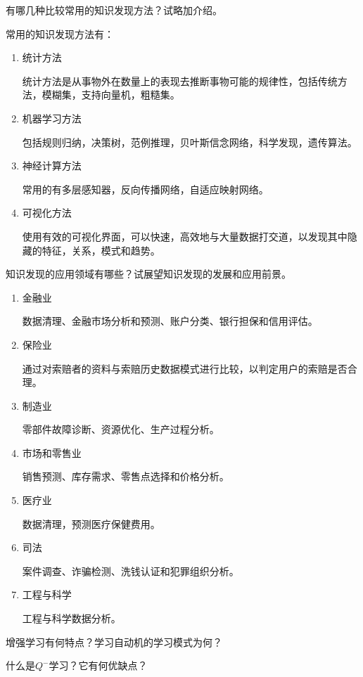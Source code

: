 \begin{question}
有哪几种比较常用的知识发现方法？试略加介绍。
\end{question}
\begin{solution}
常用的知识发现方法有：
	\begin{enumerate}
		\item 统计方法 \par
		统计方法是从事物外在数量上的表现去推断事物可能的规律性，包括传统方法，模糊集，支持向量机，粗糙集。
		\item 机器学习方法 \par
		包括规则归纳，决策树，范例推理，贝叶斯信念网络，科学发现，遗传算法。
		\item 神经计算方法 \par
		常用的有多层感知器，反向传播网络，自适应映射网络。
		\item 可视化方法 \par
		使用有效的可视化界面，可以快速，高效地与大量数据打交道，以发现其中隐藏的特征，关系，模式和趋势。
	\end{enumerate}
\end{solution}

\begin{question}
知识发现的应用领域有哪些？试展望知识发现的发展和应用前景。
\end{question}
\begin{solution}
	\begin{enumerate}
		\item 金融业 \par
		数据清理、金融市场分析和预测、账户分类、银行担保和信用评估。
		\item 保险业 \par
		通过对索赔者的资料与索赔历史数据模式进行比较，以判定用户的索赔是否合理。
		\item 制造业 \par
		零部件故障诊断、资源优化、生产过程分析。
		\item 市场和零售业 \par
		销售预测、库存需求、零售点选择和价格分析。
		\item 医疗业 \par
		数据清理，预测医疗保健费用。
		\item 司法 \par
		案件调查、诈骗检测、洗钱认证和犯罪组织分析。
		\item 工程与科学 \par
		工程与科学数据分析。
	\end{enumerate}
\end{solution}

\begin{question}
增强学习有何特点？学习自动机的学习模式为何？
\end{question}
\begin{solution}
\end{solution}

\begin{question}
什么是$Q^-$学习？它有何优缺点？
\end{question}
\begin{solution}
\end{solution}